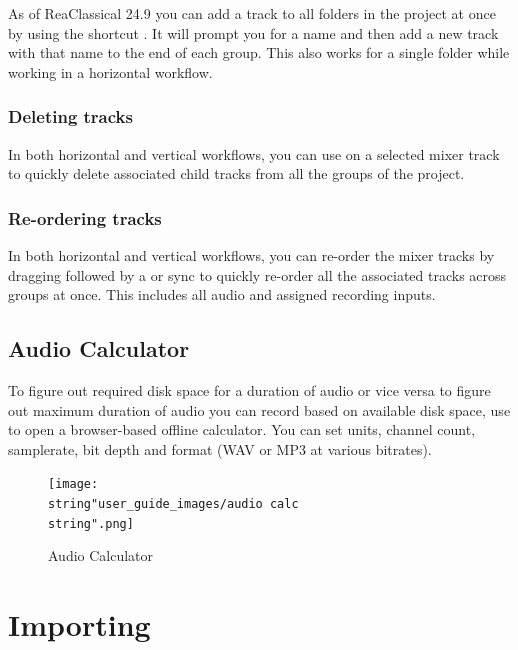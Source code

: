 \documentclass[10pt,american]{article}
\begin{document}
As of ReaClassical 24.9 you can add a track to all folders in the project at
once by using the shortcut . It will prompt you for a name and
then add a new track with that name to the end of each group. This also works
for a single folder while working in a horizontal workflow.

\subsubsection{Deleting tracks}

In both horizontal and vertical workflows, you can use \keys{\ctrl+\shift+\del}
on a selected mixer track to quickly delete associated child tracks from all the
groups of the project.

\subsubsection{Re-ordering tracks}

In both horizontal and vertical workflows, you can re-order the mixer tracks by
dragging followed by a  or  sync to quickly re-order all the
associated tracks across groups at once. This includes all audio and assigned
recording inputs.

\subsection{Audio Calculator}

To figure out required disk space for a duration of audio or vice versa to
figure out maximum duration of audio you can record based on available disk
space, use  to open a browser-based offline calculator. You can
set units, channel count, samplerate, bit depth and format (WAV or MP3 at
various bitrates).

\begin{figure}
\begin{centering}
\texttt{[image: \\string"user\_guide\_images/audio calc\\string".png]}
\par\end{centering}
\caption{Audio Calculator}
\end{figure}


\section{Importing}
\end{document}
